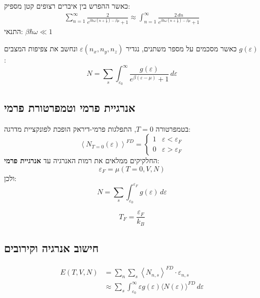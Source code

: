 \begin{cheatformula}
כאשר ההפרש בין איברים רצופים קטן מספיק:
\begin{align*}
\sum_{n=1}^\infty \frac{2}{e^{\beta \hbar \omega \left(n+\frac{1}{2} \right) - \beta \mu}+1} \approx \int_{n=1}^\infty \frac{2 \, dn}{e^{\beta \hbar \omega \left(n+\frac{1}{2} \right) - \beta \mu}+1}
\end{align*}
התנאי: $\beta \hbar \omega \ll 1$
\end{cheatformula}

\begin{cheatformula}
כאשר מסכמים על מספר משתנים, נגדיר $\varepsilon(n_x,n_y,n_z)$ ונחשב את צפיפות המצבים $g(\varepsilon)$:
$$N = \sum_s \int_{\varepsilon_0}^\infty \frac{g(\varepsilon)}{e^{\beta(\varepsilon - \mu)} + 1} \, d\varepsilon$$
\end{cheatformula}

\subsection{אנרגיית פרמי וטמפרטורת פרמי}

\begin{cheatformula}
בטמפרטורה $T=0$, התפלגות פרמי-דיראק הופכת לפונקציית מדרגה:
$$\left< N_{T=0}(\varepsilon) \right>^{FD} = \begin{cases}
    1 & \varepsilon < \varepsilon_F \\
    0 & \varepsilon > \varepsilon_F
\end{cases}$$
החלקיקים ממלאים את רמות האנרגיה עד \textbf{אנרגיית פרמי}:
$$\varepsilon_F = \mu \left(T=0, V,N\right)$$
ולכן:
$$N = \sum_s \int_{\varepsilon_0}^{\varepsilon_F} g(\varepsilon) \, d\varepsilon$$
\end{cheatformula}

\begin{cheatformula}
$$T_F = \frac{\varepsilon_F}{k_B}$$
\end{cheatformula}

\subsection{חישוב אנרגיה וקירובים}

\begin{cheatformula}
\begin{align*} 
E \left(T,V,N\right) &= \sum_n \sum_s \left< N_{n,s} \right>^{FD} \cdot \varepsilon_{n,s} \\
    &\approx \sum_s \int_{\varepsilon_0}^{\infty} \varepsilon g\left(\varepsilon\right) \langle N(\varepsilon) \rangle^{FD} \, d\varepsilon
\end{align*}
\end{cheatformula}


